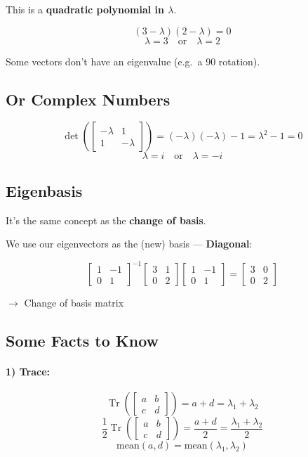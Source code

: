This is a \textbf{quadratic polynomial in $\lambda$}.

\[
(3-\lambda)(2-\lambda) = 0
\]
\[
\lambda = 3 \quad \text{or} \quad \lambda = 2
\]

\begin{notebox}
Some vectors don't have an eigenvalue (e.g.\ a 90\textdegree{} rotation).
\end{notebox}

\subsection{Or Complex Numbers}

\[
\det\left(\begin{bmatrix} -\lambda & 1 \\ 1 & -\lambda \end{bmatrix}\right) = (-\lambda)(-\lambda) - 1 = \lambda^2 - 1 = 0
\]
\[
\lambda = i \quad \text{or} \quad \lambda = -i
\]

\subsection{Eigenbasis}
\begin{defbox}
It's the same concept as the \textbf{change of basis}.
\end{defbox}

We use our eigenvectors as the (new) basis --- \textbf{Diagonal}:

\[
\begin{bmatrix} 1 & -1 \\ 0 & 1 \end{bmatrix}^{-1}
\begin{bmatrix} 3 & 1 \\ 0 & 2 \end{bmatrix}
\begin{bmatrix} 1 & -1 \\ 0 & 1 \end{bmatrix}
=
\begin{bmatrix} 3 & 0 \\ 0 & 2 \end{bmatrix}
\]

$\rightarrow$ Change of basis matrix

\subsection{Some Facts to Know}

\paragraph{1) Trace:}
\[
\operatorname{Tr}\left(\begin{bmatrix} a & b \\ c & d \end{bmatrix}\right) = a + d = \lambda_1 + \lambda_2
\]
\[
\frac{1}{2}\operatorname{Tr}\left(\begin{bmatrix} a & b \\ c & d \end{bmatrix}\right) = \frac{a+d}{2} = \frac{\lambda_1 + \lambda_2}{2}
\]
\[
\text{mean}(a,d) = \text{mean}(\lambda_1, \lambda_2)
\]

